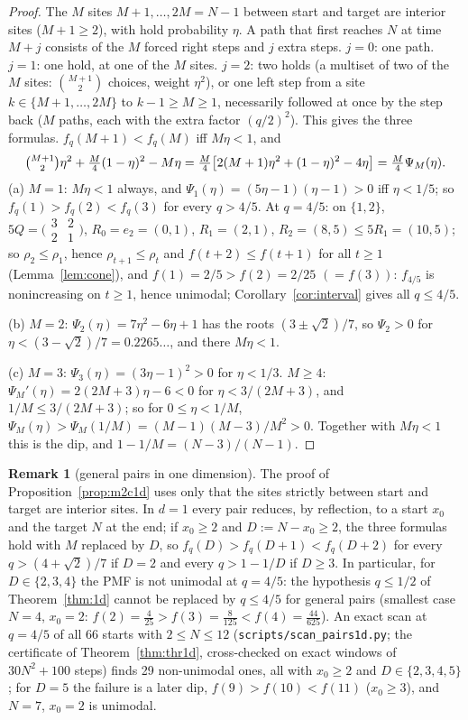 \documentclass[11pt,a4paper]{article}
\theoremstyle{definition}
\newtheorem*{remarku}{Remark}
\begin{document}
\begin{proof}
The $M$ sites $M+1,\dots,2M=N-1$ between start and target are interior sites ($M+1\ge2$), with hold probability $\eta$. A path that first reaches $N$ at time $M+j$ consists of the $M$ forced right steps and $j$ extra steps. $j=0$: one path. $j=1$: one hold, at one of the $M$ sites. $j=2$: two holds (a multiset of two of the $M$ sites: $\binom{M+1}2$ choices, weight $\eta^2$), or one left step from a site $k\in\{M+1,\dots,2M\}$ to $k-1\ge M\ge1$, necessarily followed at once by the step back ($M$ paths, each with the extra factor $(q/2)^2$). This gives the three formulas. $f_q(M+1)<f_q(M)$ iff $M\eta<1$, and
\[
\tbinom{M+1}2\eta^2+\tfrac M4(1-\eta)^2-M\eta=\tfrac M4\bigl[2(M+1)\eta^2+(1-\eta)^2-4\eta\bigr]=\tfrac M4\Psi_M(\eta).
\]
(a) $M=1$: $M\eta<1$ always, and $\Psi_1(\eta)=(5\eta-1)(\eta-1)>0$ iff $\eta<1/5$; so $f_q(1)>f_q(2)<f_q(3)$ for every $q>4/5$. At $q=4/5$: on $\{1,2\}$, $5Q=\bigl(\begin{smallmatrix}3&2\\2&1\end{smallmatrix}\bigr)$, $R_0=e_2=(0,1)$, $R_1=(2,1)$, $R_2=(8,5)\le5R_1=(10,5)$; so $\rho_2\le\rho_1$, hence $\rho_{t+1}\le\rho_t$ and $f(t+2)\le f(t+1)$ for all $t\ge1$ (Lemma~\ref{lem:cone}), and $f(1)=2/5>f(2)=2/25$ $(=f(3))$: $f_{4/5}$ is nonincreasing on $t\ge1$, hence unimodal; Corollary~\ref{cor:interval} gives all $q\le4/5$.

(b) $M=2$: $\Psi_2(\eta)=7\eta^2-6\eta+1$ has the roots $(3\pm\sqrt2)/7$, so $\Psi_2>0$ for $\eta<(3-\sqrt2)/7=0.2265\ldots$, and there $M\eta<1$.

(c) $M=3$: $\Psi_3(\eta)=(3\eta-1)^2>0$ for $\eta<1/3$. $M\ge4$: $\Psi_M'(\eta)=2(2M+3)\eta-6<0$ for $\eta<3/(2M+3)$, and $1/M\le3/(2M+3)$; so for $0\le\eta<1/M$, $\Psi_M(\eta)>\Psi_M(1/M)=(M-1)(M-3)/M^2>0$. Together with $M\eta<1$ this is the dip, and $1-1/M=(N-3)/(N-1)$.
\end{proof}

\begin{remarku}[general pairs in one dimension]
The proof of Proposition~\ref{prop:m2c1d} uses only that the sites strictly between start and target are interior sites. In $d=1$ every pair reduces, by reflection, to a start $x_0$ and the target $N$ at the end; if $x_0\ge2$ and $D:=N-x_0\ge2$, the three formulas hold with $M$ replaced by $D$, so $f_q(D)>f_q(D+1)<f_q(D+2)$ for every $q>(4+\sqrt2)/7$ if $D=2$ and every $q>1-1/D$ if $D\ge3$. In particular, for $D\in\{2,3,4\}$ the PMF is not unimodal at $q=4/5$: the hypothesis $q\le1/2$ of Theorem~\ref{thm:1d} cannot be replaced by $q\le4/5$ for general pairs (smallest case $N=4$, $x_0=2$: $f(2)=\frac4{25}>f(3)=\frac8{125}<f(4)=\frac{44}{625}$). An exact scan at $q=4/5$ of all 66 starts with $2\le N\le12$ (\texttt{scripts/scan\_pairs1d.py}; the certificate of Theorem~\ref{thm:thr1d}, cross-checked on exact windows of $30N^2+100$ steps) finds 29 non-unimodal ones, all with $x_0\ge2$ and $D\in\{2,3,4,5\}$; for $D=5$ the failure is a later dip, $f(9)>f(10)<f(11)$ ($x_0\ge3$), and $N=7$, $x_0=2$ is unimodal.
\end{remarku}
\end{document}

